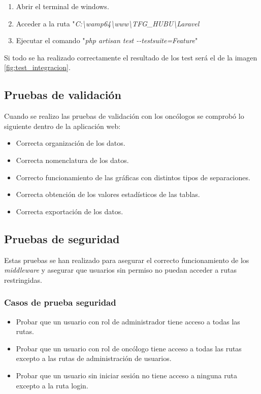 \begin{enumerate}
    \item Abrir el terminal de windows.
    \item Acceder a la ruta "\textit{C:\textbackslash{}wamp64\textbackslash{}www\textbackslash{}TFG\_HUBU\textbackslash{}Laravel}
    \item Ejecutar el comando "\textit{php artisan test -{}-testsuite=Feature}"
\end{enumerate}

\newpage

Si todo se ha realizado correctamente el resultado de los test será el de la imagen \ref{fig:test_integracion}.


\subsection{Pruebas de validación}

Cuando se realizo las pruebas de validación con los oncólogos se comprobó lo siguiente dentro de la aplicación web:

\begin{itemize}
    \item Correcta organización de los datos.
    \item Correcta nomenclatura de los datos.
    \item Correcto funcionamiento de las gráficas con distintos tipos de separaciones.
    \item Correcta obtención de los valores estadísticos de las tablas.
    \item Correcta exportación de los datos.
\end{itemize}


\subsection{Pruebas de seguridad}

Estas pruebas se han realizado para asegurar el correcto funcionamiento de los \textit{middleware} y asegurar que usuarios sin permiso no puedan acceder a rutas restringidas.

\subsubsection{Casos de prueba seguridad}

\begin{itemize}
    \item Probar que un usuario con rol de administrador tiene acceso a todas las rutas.
    \item Probar que un usuario con rol de oncólogo tiene acceso a todas las rutas excepto a las rutas de administración de usuarios.
    \item Probar que un usuario sin iniciar sesión no tiene acceso a ninguna ruta excepto a la ruta login.
\end{itemize}


